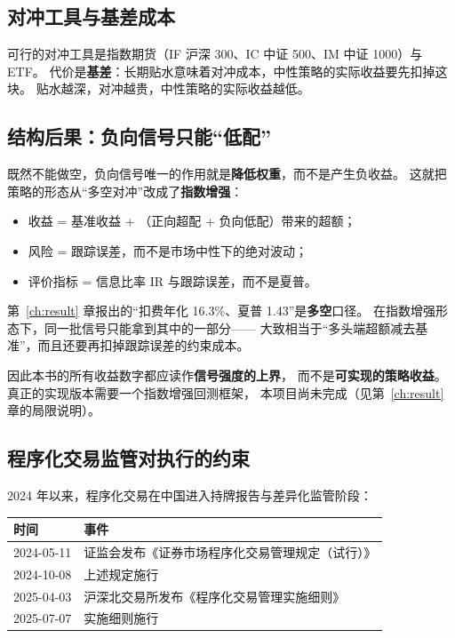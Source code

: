 \subsection{对冲工具与基差成本}

可行的对冲工具是指数期货（IF 沪深 300、IC 中证 500、IM 中证 1000）与 ETF。
代价是\textbf{基差}：长期贴水意味着对冲成本，中性策略的实际收益要先扣掉这块。
贴水越深，对冲越贵，中性策略的实际收益越低。

\subsection{结构后果：负向信号只能“低配”}

既然不能做空，负向信号唯一的作用就是\textbf{降低权重}，而不是产生负收益。
这就把策略的形态从“多空对冲”改成了\textbf{指数增强}：

\begin{itemize}
  \item 收益 = 基准收益 + （正向超配 + 负向低配）带来的超额；
  \item 风险 = 跟踪误差，而不是市场中性下的绝对波动；
  \item 评价指标 = 信息比率 IR 与跟踪误差，而不是夏普。
\end{itemize}

\begin{keybox}[这对本项目意味着什么]
第~\ref{ch:result} 章报出的“扣费年化 16.3\%、夏普 1.43”是\textbf{多空}口径。
在指数增强形态下，同一批信号只能拿到其中的一部分——
大致相当于“多头端超额减去基准”，而且还要再扣掉跟踪误差的约束成本。

因此本书的所有收益数字都应读作\textbf{信号强度的上界}，
而不是\textbf{可实现的策略收益}。真正的实现版本需要一个指数增强回测框架，
本项目尚未完成（见第~\ref{ch:result} 章的局限说明）。
\end{keybox}

\subsection{程序化交易监管对执行的约束}

2024 年以来，程序化交易在中国进入持牌报告与差异化监管阶段：

\begin{center}
\begin{tabular}{@{}ll@{}}
\toprule
时间 & 事件 \\
\midrule
2024-05-11 & 证监会发布《证券市场程序化交易管理规定（试行）》 \\
2024-10-08 & 上述规定施行 \\
2025-04-03 & 沪深北交易所发布《程序化交易管理实施细则》 \\
2025-07-07 & 实施细则施行 \\
\bottomrule
\end{tabular}
\end{center}

